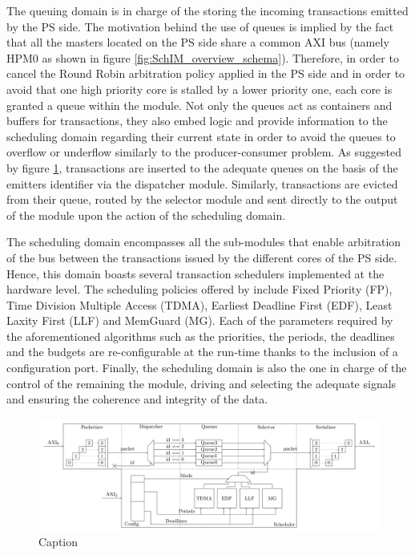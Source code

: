 The queuing domain is in charge of the storing the incoming
transactions emitted by the PS side.  The motivation behind the use of
queues is implied by the fact that all the masters located on the PS
side share a common AXI bus (namely HPM0 as shown in figure
\ref{fig:SchIM_overview_schema}).  Therefore, in order to cancel the
Round Robin arbitration policy applied in the PS side and in order to
avoid that one high priority core is stalled by a lower priority one,
each core is granted a queue within the \schim module.  Not only the
queues act as containers and buffers for transactions, they also embed
logic and provide information to the scheduling domain regarding their
current state in order to avoid the queues to overflow or underflow
similarly to the producer-consumer problem.  As suggested by figure
\ref{fig:MemorEDF_module_schema}, transactions are inserted to the
adequate queues on the basis of the emitters identifier via the
dispatcher module.  Similarly, transactions are evicted from their
queue, routed by the selector module and sent directly to the output
of the module upon the action of the scheduling domain.

The scheduling domain encompasses all the sub-modules that enable
arbitration of the bus between the transactions issued by the
different cores of the PS side. Hence, this domain boasts several
transaction schedulers implemented at the hardware level.  The
scheduling policies offered by \schim include Fixed Priority (FP), Time
Division Multiple Access (TDMA), Earliest Deadline First (EDF), Least
Laxity First (LLF) and MemGuard (MG).  Each of the parameters required
by the aforementioned algorithms such as the priorities, the periods,
the deadlines and the budgets are re-configurable at the run-time
thanks to the inclusion of a configuration port.  Finally, the
scheduling domain is also the one in charge of the control of the
remaining the \schim module, driving and selecting the adequate signals
and ensuring the coherence and integrity of the data.

\begin{figure}
  \centering
  \includegraphics[scale=0.08]{images/MemorEDF_module_schema.png}
  \caption{Caption}
  \label{fig:MemorEDF_module_schema}
\end{figure}

